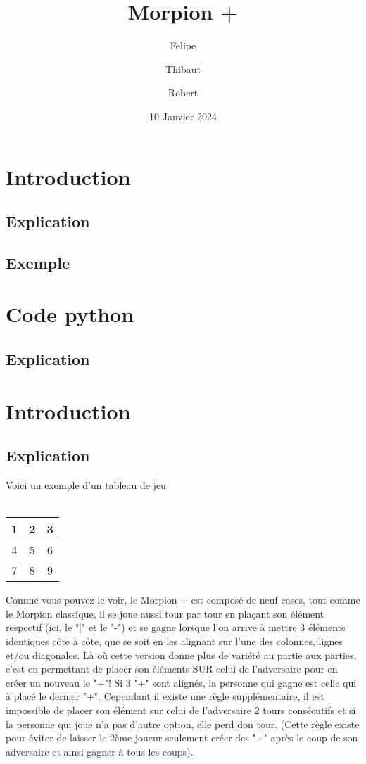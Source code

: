\documentclass[12pt]{article}
\title{
  \Huge \textbf{Morpion +}
  \linespread{2.5}
}
\author{{Felipe} 
        \and 
        {Thibaut}
        \and
        {Robert}}
\date{10 Janvier 2024}
\begin{document}
\maketitle

\pagebreak

\section{Introduction}
   \subsection{Explication}
   \subsection{Exemple}

\section{Code python}
   \subsection{Explication}


\pagebreak
\setcounter{section}{0}

\section{Introduction}

\subsection{Explication}
    \qquad Voici un exemple d'un tableau de jeu \\ \\

\begin{tabular}{c|c|c}
  1 & 2 & 3 \\      \hline
  4 & 5 & 6 \\      \hline
  7 & 8 & 9
\end{tabular}

    \qquad 
    
    Comme vous pouvez le voir, le Morpion + est composé de neuf cases, tout comme le Morpion classique, il se joue aussi tour par tour en plaçant son élément respectif (ici, le "|" et le "-") et se gagne lorsque l'on arrive à mettre 3 éléments identiques côte à côte, que se soit en les alignant sur l'une des colonnes, lignes et/ou diagonales. Là où cette version donne plus de variété au partie aux parties, c'est en permettant de placer son éléments SUR celui de l'adversaire pour en créer un nouveau le "+"! Si 3 "+" sont alignés, la personne qui gagne est celle qui à placé le  dernier "+". Cependant il existe une règle supplémentaire, il est impossible de placer son élément sur celui de l'adversaire 2 tours consécutifs et si la personne qui joue n'a pas d'autre option, elle perd don tour. (Cette règle existe pour éviter de laisser le 2ème joueur seulement créer des "+" après le coup de son adversaire et ainsi gagner à tous les coups).
    
\end{document}
